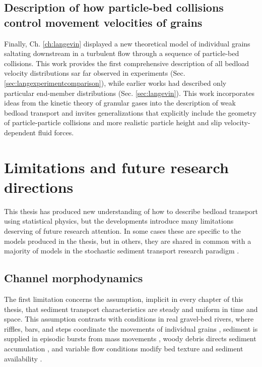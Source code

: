 \subsection{Description of how particle-bed collisions control movement velocities of grains}

Finally, Ch. \ref{ch:langevin} displayed a new theoretical model of individual grains saltating downstream in a turbulent flow through a sequence of particle-bed collisions.
This work provides the first comprehensive description of all bedload velocity distributions sar far observed in experiments (Sec. \ref{sec:langexperimentcomparison}), while earlier works had described only particular end-member distributions (Sec. \ref{sec:langevin}).
This work incorporates ideas from the kinetic theory of granular gases into the description of weak bedload transport and invites generalizations that explicitly include the geometry of particle-particle collisions and more realistic particle height and slip velocity-dependent fluid forces.

\section{Limitations and future research directions}

This thesis has produced new understanding of how to describe bedload transport using statistical physics, but the developments introduce many limitations deserving of future research attention.
In some cases these are specific to the models produced in the thesis, but in others, they are shared in common with a majority of models in the stochastic sediment transport research paradigm \citep[e.g.][]{Ancey2020,Furbish2021a}.

\subsection{Channel morphodynamics}

The first limitation concerns the assumption, implicit in every chapter of this thesis, that sediment transport characteristics are steady and uniform in time and space.
This assumption contrasts with conditions in real gravel-bed rivers, where riffles, bars, and steps coordinate the movements of individual grains \citep{Ashmore1998,McDowell2020}, sediment is supplied in episodic bursts from mass movements \citep{Benda1990, Muller2018}, woody debris directs sediment accumulation \citep{Eaton2012,Reid2019}, and variable flow conditions modify bed texture and sediment availability \citep{Mao2012,Phillips2018}.

